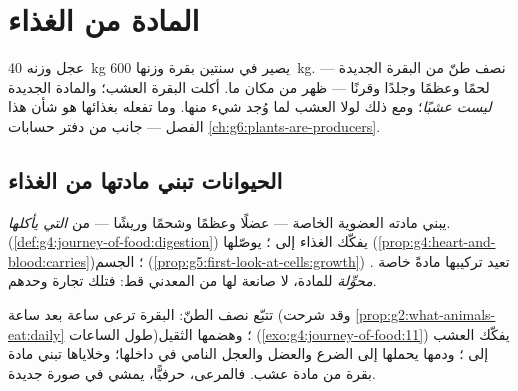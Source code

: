 \chapter{المادة من الغذاء}\label{ch:g6:matter-from-food}

عجل وزنه \qty{40}{kg} يصير في سنتين بقرة وزنها
\qty{600}{kg}. نصف طنّ من البقرة الجديدة --- لحمًا وعظمًا وجلدًا
وقرنًا --- ظهر من مكان ما. أكلت البقرة العشب؛ والمادة الجديدة
\emph{ليست عشبًا}؛ ومع ذلك لولا العشب لما وُجد شيء منها. وما تفعله
 بغذائها هو شأن هذا الفصل --- جانب  من دفتر
حسابات \cref{ch:g6:plants-are-producers}.

\section{الحيوانات تبني مادتها من الغذاء}

\begin{proposition}\label{prop:g6:matter-from-food:transform}
يبني  مادته العضوية الخاصة --- عضلًا وعظمًا وشحمًا وريشًا
 --- من \emph{ التي يأكلها}. 
(\cref{def:g4:journey-of-food:digestion}) يفكّك الغذاء إلى ؛
 يوصّلها (\cref{prop:g4:heart-and-blood:carries})؛ 
الجسم (\cref{prop:g5:first-look-at-cells:growth}) تعيد تركيبها
مادةً خاصة .  \emph{محوِّلة} للمادة، لا صانعة لها
من المعدني قط: فتلك تجارة  وحدهم.
\end{proposition}
\admitted

\begin{example}\label{ex:g6:matter-from-food:cow}
تتبّع نصف الطنّ: البقرة ترعى ساعة بعد ساعة
(وقد شرحت \cref{prop:g2:what-animals-eat:daily} طول الساعات)؛
وهضمها الثقيل (\cref{exo:g4:journey-of-food:11}) يفكّك العشب إلى
؛ ودمها يحملها إلى الضرع والعضل والعجل النامي في داخلها؛
وخلاياها تبني مادة بقرة من مادة عشب. فالمرعى، حرفيًّا، يمشي في
صورة جديدة.
\end{example}

